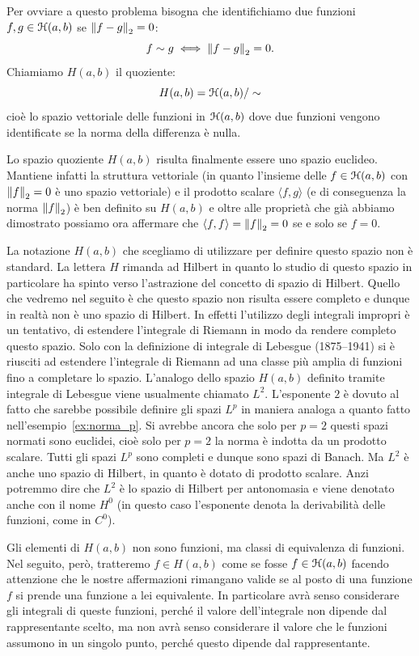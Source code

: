 Per ovviare a questo problema bisogna che identifichiamo due
funzioni $f,g\in \mathcal H(a,b)$ se ${\left\Vert f-g\right\Vert}_2=0$:
\[
  f \sim g  \iff {\left\Vert f-g\right\Vert}_2=0.
\]
Chiamiamo $H(a,b)$ il quoziente:
\[
  H(a,b) = \mathcal H(a,b)/\sim
\]
cioè lo spazio vettoriale delle funzioni in $\mathcal H(a,b)$ dove due funzioni
vengono identificate se la norma della differenza è nulla.

Lo spazio quoziente $H(a,b)$ risulta finalmente essere uno spazio
euclideo.
Mantiene infatti la struttura vettoriale (in quanto l'insieme
delle $f\in \mathcal H(a,b)$ con ${\left\Vert f\right\Vert}_2=0$
è uno spazio vettoriale)
e il prodotto scalare $\langle f,g\rangle$ (e di conseguenza la norma ${\left\Vert f\right\Vert}_2$)
è ben definito su $H(a,b)$ e oltre alle proprietà che già abbiamo dimostrato
possiamo ora affermare che $\langle f,f\rangle = {\left\Vert f\right\Vert}_2=0$ se e solo se $f=0$.

\begin{remark}
La notazione $H(a,b)$ che scegliamo di utilizzare per definire questo spazio
non è standard. La lettera $H$ rimanda ad Hilbert in quanto lo studio di questo
spazio in particolare ha spinto verso l'astrazione del concetto di spazio di Hilbert.
Quello che vedremo nel seguito è che questo spazio
non risulta essere completo e dunque in realtà non è uno spazio di Hilbert.
In effetti l'utilizzo degli integrali impropri è un tentativo, di
estendere l'integrale di Riemann in modo da rendere completo questo spazio.
Solo con la definizione di integrale di Lebesgue (1875--1941)
si è riusciti ad estendere l'integrale di Riemann
ad una classe più amplia di funzioni fino a completare lo spazio.
L'analogo dello spazio $H(a,b)$ definito tramite integrale di Lebesgue
viene
usualmente chiamato $L^2$. L'esponente $2$ è dovuto al fatto che
sarebbe possibile definire gli spazi $L^p$
in maniera analoga a quanto fatto nell'esempio~\ref{ex:norma_p}.
Si avrebbe ancora che solo per $p=2$ questi spazi normati sono euclidei,
cioè solo per $p=2$ la norma è indotta da un prodotto scalare.
Tutti gli spazi $L^p$ sono completi e dunque sono spazi di Banach.
Ma $L^2$ è anche uno spazio di Hilbert, in quanto è dotato di prodotto scalare.
Anzi potremmo dire che $L^2$ è lo spazio di Hilbert per antonomasia
e viene denotato anche con il nome $H^0$
(in questo caso l'esponente denota la derivabilità delle funzioni, come
in $C^0$).
\end{remark}

Gli elementi di $H(a,b)$ non sono funzioni, ma classi di equivalenza di funzioni.
Nel seguito, però, tratteremo $f\in H(a,b)$ come se fosse $f\in \mathcal H(a,b)$
facendo attenzione che le nostre affermazioni rimangano valide se al posto
di una funzione $f$ si prende una funzione a lei equivalente.
In particolare avrà senso considerare gli integrali di queste funzioni, perché il
valore dell'integrale non dipende dal rappresentante scelto, ma non avrà senso
considerare il valore che le funzioni assumono in un singolo punto, perché
questo dipende dal rappresentante.

